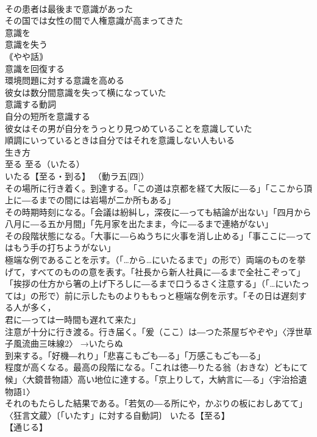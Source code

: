 \documentclass[8pt]{extreport}
\begin{document}
\begin{CJK}{UTF8}{min}
\\	その患者は最後まで意識があった 
\\	その国では女性の間で人権意識が高まってきた 
\\	意識を 
\\	意識を失う 
\\	｟やや話｠ 
\\	意識を回復する 
\\	環境問題に対する意識を高める 
\\	彼女は数分間意識を失って横になっていた 
\\	意識する動詞 
\\	自分の短所を意識する 
\\	彼女はその男が自分をうっとり見つめていることを意識していた 
\\	順調にいっているときは自分ではそれを意識しない人もいる 
\\	生き方		
\\	至る		至る（いたる） 
\\	いたる【至る・到る】 （動ラ五[四]） 
\\	その場所に行き着く。到達する。「この道は京都を経て大阪に―る」「ここから頂上に―るまでの間には岩場が二か所もある」 
\\	その時期時刻になる。「会議は紛糾し，深夜に―っても結論が出ない」「四月から八月に―る五か月間」「先月家を出たまま，今に―るまで連絡がない」 
\\	その段階状態になる。「大事に―らぬうちに火事を消し止める」「事ここに―ってはもう手の打ちようがない」 
\\	極端な例であることを示す。（「…から…にいたるまで」の形で）両端のものを挙げて，すべてのものの意を表す。「社長から新人社員に―るまで全社こぞって」「挨拶の仕方から箸の上げ下ろしに―るまで口うるさく注意する」（「…にいたっては」の形で）前に示したものよりももっと極端な例を示す。「その日は遅刻する人が多く，
\\	君に―っては一時間も遅れて来た」 
\\	注意が十分に行き渡る。行き届く。「爰（ここ）は―つた茶屋ぢやぞや」〈浮世草子風流曲三味線2〉 →いたらぬ 
\\	到来する。「好機―れり」「悲喜こもごも―る」「万感こもごも―る」 
\\	程度が高くなる。最高の段階になる。「これは徳―りたる翁（おきな）どもにて候」〈大鏡昔物語〉高い地位に達する。「京上りして，大納言に―る」〈宇治拾遺物語1〉 
\\	それのもたらした結果である。「若気の―る所にや，かぶりの板におしあてて」〈狂言文蔵〉〔「いたす」に対する自動詞〕 いたる【至る】 
\\	【通じる】 

\end{CJK}
\end{document}
